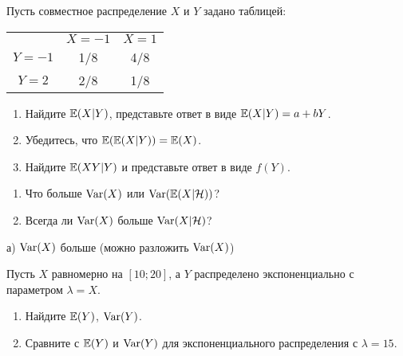 \begin{problem}
 Пусть совместное распределение $X$ и $Y$ задано таблицей: \\
\begin{tabular}{ccc}
  \toprule
   & $X=-1$ & $X=1$ \\
  $Y=-1$ & 1/8 & 4/8 \\
  $Y=2$ & 2/8 & 1/8 \\
  \bottomrule
\end{tabular}
\begin{enumerate}
\item Найдите $\mathbb{E}(X|Y)$, представьте ответ в виде $\mathbb{E}(X|Y)=a+bY$.
\item Убедитесь, что $\mathbb{E}(\mathbb{E}(X|Y))=\mathbb{E}(X)$.
\item Найдите $\mathbb{E}(XY|Y)$ и представьте ответ в виде $f(Y)$.
\end{enumerate}

\begin{sol}

\end{sol}
\end{problem}

\begin{problem}
\begin{enumerate}
\item  Что больше $\operatorname{Var}(X)$ или $\operatorname{Var}(\mathbb{E}(X|\mathcal{H}))$?
\item Всегда ли $\operatorname{Var}(X)$ больше $\operatorname{Var}(X|\mathcal{H})$?
\end{enumerate}

\begin{sol}

 а) $\operatorname{Var}(X)$ больше (можно разложить $\operatorname{Var}(X)$)
\end{sol}
\end{problem}

\begin{problem}
Пусть $X$ равномерно на $[10;20]$, а $Y$ распределено экспоненциально с параметром $\lambda=X$.
\begin{enumerate}
\item Найдите $\mathbb{E}(Y)$, $\operatorname{Var}(Y)$.
\item Сравните с $\mathbb{E}(Y)$ и $\operatorname{Var}(Y)$ для экспоненциального распределения с $\lambda=15$.
\end{enumerate}

\begin{sol}

\end{sol}
\end{problem}

